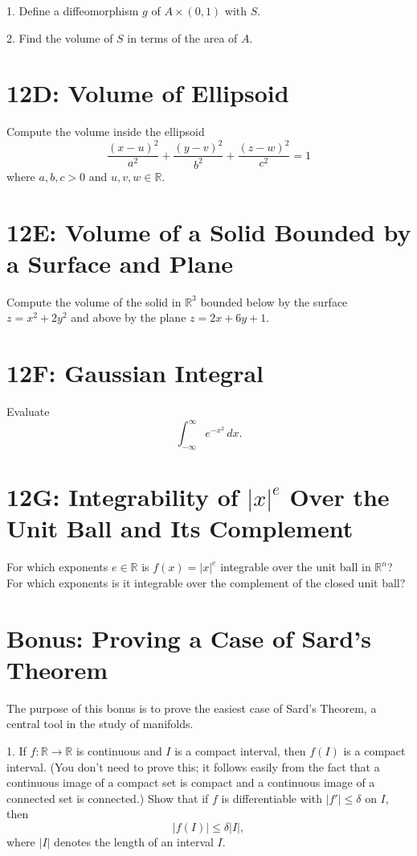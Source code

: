 \documentclass[lang=cn,11pt]{template}
\begin{document}
1. Define a diffeomorphism \( g \) of \( A \times (0, 1) \) with \( S \).

2. Find the volume of \( S \) in terms of the area of \( A \).

\section*{12D: Volume of Ellipsoid}
Compute the volume inside the ellipsoid
\[
\frac{(x - u)^2}{a^2} + \frac{(y - v)^2}{b^2} + \frac{(z - w)^2}{c^2} = 1
\]
where \( a, b, c > 0 \) and \( u, v, w \in \mathbb{R} \).

\section*{12E: Volume of a Solid Bounded by a Surface and Plane}
Compute the volume of the solid in \( \mathbb{R}^3 \) bounded below by the surface \( z = x^2 + 2y^2 \) and above by the plane \( z = 2x + 6y + 1 \).

\section*{12F: Gaussian Integral}
Evaluate
\[
\int_{-\infty}^{\infty} e^{-x^2} \, dx.
\]

\section*{12G: Integrability of \( |x|^e \) Over the Unit Ball and Its Complement}
For which exponents \( e \in \mathbb{R} \) is \( f(x) = |x|^e \) integrable over the unit ball in \( \mathbb{R}^n \)? For which exponents is it integrable over the complement of the closed unit ball?

\section*{Bonus: Proving a Case of Sard’s Theorem}
The purpose of this bonus is to prove the easiest case of Sard’s Theorem, a central tool in the study of manifolds.

1. If \( f : \mathbb{R} \rightarrow \mathbb{R} \) is continuous and \( I \) is a compact interval, then \( f(I) \) is a compact interval. (You don’t need to prove this; it follows easily from the fact that a continuous image of a compact set is compact and a continuous image of a connected set is connected.) Show that if \( f \) is differentiable with \( |f'| \leq \delta \) on \( I \), then
   \[
   |f(I)| \leq \delta |I|,
   \]
   where \( |I| \) denotes the length of an interval \( I \).
\end{document}
